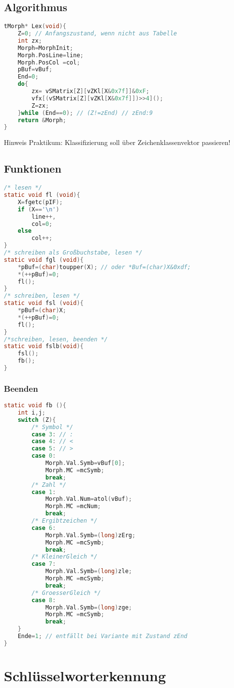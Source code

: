 \subsection{Algorithmus}
\begin{lstlisting}[language=C]
tMorph* Lex(void){
	Z=0; // Anfangszustand, wenn nicht aus Tabelle
	int zx;
	Morph=MorphInit;
	Morph.PosLine=line;
	Morph.PosCol =col;
	pBuf=vBuf;
	End=0;
	do{
		zx= vSMatrix[Z][vZKl[X&0x7f]]&0xF;
		vfx[(vSMatrix[Z][vZKl[X&0x7f]])>>4]();
		Z=zx;
	}while (End==0); // (Z!=zEnd) // zEnd:9
	return &Morph;
}
\end{lstlisting}

Hinweis Praktikum: Klassifizierung soll über Zeichenklassenvektor passieren!

\subsection{Funktionen}
\begin{lstlisting}[language=C]
/* lesen */
static void fl (void){
	X=fgetc(pIF);
	if (X=='\n') 
		line++,
		col=0;
	else 
		col++;
}
/* schreiben als Großbuchstabe, lesen */
static void fgl (void){
	*pBuf=(char)toupper(X);	// oder *Buf=(char)X&0xdf;
	*(++pBuf)=0;
	fl();
}
/* schreiben, lesen */
static void fsl (void){
	*pBuf=(char)X;
	*(++pBuf)=0;
	fl();
}
/*schreiben, lesen, beenden */
static void fslb(void){
	fsl();
	fb();
}
\end{lstlisting}

\subsubsection{Beenden}
\begin{lstlisting}[language=C]
static void fb (){
	int i,j;
	switch (Z){
		/* Symbol */
		case 3: // :
		case 4: // <
		case 5: // >
		case 0:
			Morph.Val.Symb=vBuf[0];
			Morph.MC =mcSymb;
			break;
		/* Zahl */
		case 1:
			Morph.Val.Num=atol(vBuf);
			Morph.MC =mcNum;
			break;
		/* Ergibtzeichen */
		case 6:
			Morph.Val.Symb=(long)zErg;
			Morph.MC =mcSymb;
			break;
		/* KleinerGleich */
		case 7:
			Morph.Val.Symb=(long)zle;
			Morph.MC =mcSymb;
			break;
		/* GroesserGleich */
		case 8:
			Morph.Val.Symb=(long)zge;
			Morph.MC =mcSymb;
			break;
	}
	Ende=1; // entfällt bei Variante mit Zustand zEnd
}
\end{lstlisting}

\section{Schlüsselworterkennung}

